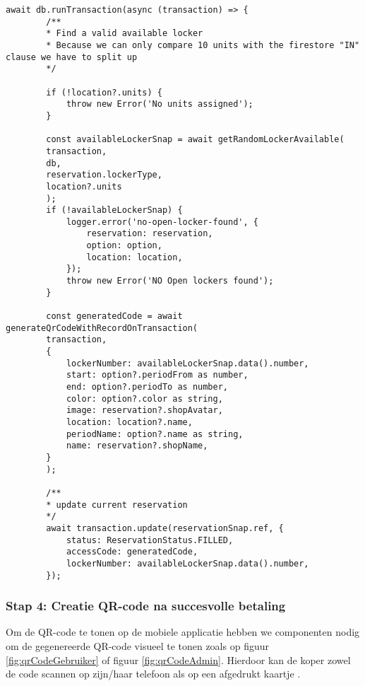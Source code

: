 \begin{lstlisting}[caption={Voltooide betaling roept de creatie QR-code methode op. Hierbij gebeurt een status update van de vooraf aangemaakte reservatie.}, label={lst:voltooidebetaling}]
    await db.runTransaction(async (transaction) => {
        /**
        * Find a valid available locker
        * Because we can only compare 10 units with the firestore "IN" clause we have to split up
        */
        
        if (!location?.units) {
            throw new Error('No units assigned');
        }
        
        const availableLockerSnap = await getRandomLockerAvailable(
        transaction,
        db,
        reservation.lockerType,
        location?.units
        );
        if (!availableLockerSnap) {
            logger.error('no-open-locker-found', {
                reservation: reservation,
                option: option,
                location: location,
            });
            throw new Error('NO Open lockers found');
        }
        
        const generatedCode = await generateQrCodeWithRecordOnTransaction(
        transaction,
        {
            lockerNumber: availableLockerSnap.data().number,
            start: option?.periodFrom as number,
            end: option?.periodTo as number,
            color: option?.color as string,
            image: reservation?.shopAvatar,
            location: location?.name,
            periodName: option?.name as string,
            name: reservation?.shopName,
        }
        );
        
        /**
        * update current reservation
        */
        await transaction.update(reservationSnap.ref, {
            status: ReservationStatus.FILLED,
            accessCode: generatedCode,
            lockerNumber: availableLockerSnap.data().number,
        });
\end{lstlisting}

\newpage
\subsubsection{Stap 4: Creatie QR-code na succesvolle betaling}%
\label{sec:opbouwQR-codeVerkoop123}

Om de QR-code te tonen op de mobiele applicatie hebben we componenten nodig om de gegenereerde QR-code visueel te tonen zoals op figuur \ref{fig:qrCodeGebruiker} of figuur \ref{fig:qrCodeAdmin}. Hierdoor kan de koper zowel de code scannen op zijn/haar telefoon als op een afgedrukt kaartje \autocite{Chow2016}.


